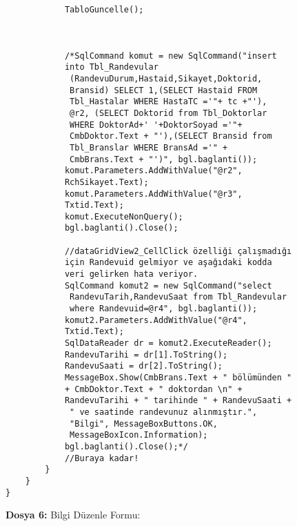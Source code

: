 \begin{lstlisting}
            TabloGuncelle();
            


            /*SqlCommand komut = new SqlCommand("insert 
            into Tbl_Randevular
             (RandevuDurum,Hastaid,Sikayet,Doktorid,
             Bransid) SELECT 1,(SELECT Hastaid FROM 
             Tbl_Hastalar WHERE HastaTC ='"+ tc +"'), 
             @r2, (SELECT Doktorid from Tbl_Doktorlar 
             WHERE DoktorAd+' '+DoktorSoyad ='"+ 
             CmbDoktor.Text + "'),(SELECT Bransid from 
             Tbl_Branslar WHERE BransAd ='" + 
             CmbBrans.Text + "')", bgl.baglanti());
            komut.Parameters.AddWithValue("@r2", 
            RchSikayet.Text);
            komut.Parameters.AddWithValue("@r3", 
            Txtid.Text);
            komut.ExecuteNonQuery();
            bgl.baglanti().Close();

            //dataGridView2_CellClick özelliği çalışmadığı 
            için Randevuid gelmiyor ve aşağıdaki kodda 
            veri gelirken hata veriyor.
            SqlCommand komut2 = new SqlCommand("select
             RandevuTarih,RandevuSaat from Tbl_Randevular 
             where Randevuid=@r4", bgl.baglanti());
            komut2.Parameters.AddWithValue("@r4", 
            Txtid.Text);
            SqlDataReader dr = komut2.ExecuteReader();
            RandevuTarihi = dr[1].ToString();
            RandevuSaati = dr[2].ToString();
            MessageBox.Show(CmbBrans.Text + " bölümünden " 
            + CmbDoktor.Text + " doktordan \n" + 
            RandevuTarihi + " tarihinde " + RandevuSaati +
             " ve saatinde randevunuz alınmıştır.", 
             "Bilgi", MessageBoxButtons.OK, 
             MessageBoxIcon.Information);
            bgl.baglanti().Close();*/
            //Buraya kadar!
        }
    }
}
\end{lstlisting}

\textbf{Dosya 6:} Bilgi Düzenle Formu:

